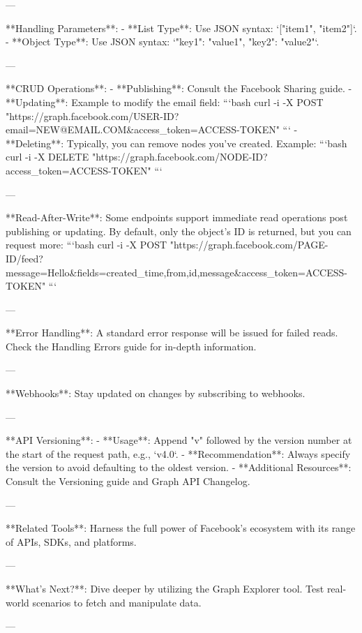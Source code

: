 ---

**Handling Parameters**:
- **List Type**: Use JSON syntax: `["item1", "item2"]`.
- **Object Type**: Use JSON syntax: `{"key1": "value1", "key2": "value2"}`.

---

**CRUD Operations**:
- **Publishing**: Consult the Facebook Sharing guide.
- **Updating**: Example to modify the email field:
  ```bash
  curl -i -X POST "https://graph.facebook.com/USER-ID?email=NEW@EMAIL.COM&access_token=ACCESS-TOKEN"
  ```
- **Deleting**: Typically, you can remove nodes you've created. Example:
  ```bash
  curl -i -X DELETE "https://graph.facebook.com/NODE-ID?access_token=ACCESS-TOKEN"
  ```

---

**Read-After-Write**:
Some endpoints support immediate read operations post publishing or updating. By default, only the object's ID is returned, but you can request more:
```bash
curl -i -X POST "https://graph.facebook.com/PAGE-ID/feed?message=Hello&fields=created_time,from,id,message&access_token=ACCESS-TOKEN"
```

---

**Error Handling**:
A standard error response will be issued for failed reads. Check the Handling Errors guide for in-depth information.

---

**Webhooks**:
Stay updated on changes by subscribing to webhooks.

---

**API Versioning**:
- **Usage**: Append "v" followed by the version number at the start of the request path, e.g., `v4.0`.
- **Recommendation**: Always specify the version to avoid defaulting to the oldest version.
- **Additional Resources**: Consult the Versioning guide and Graph API Changelog.

---

**Related Tools**:
Harness the full power of Facebook's ecosystem with its range of APIs, SDKs, and platforms.

---

**What's Next?**:  
Dive deeper by utilizing the Graph Explorer tool. Test real-world scenarios to fetch and manipulate data.

---